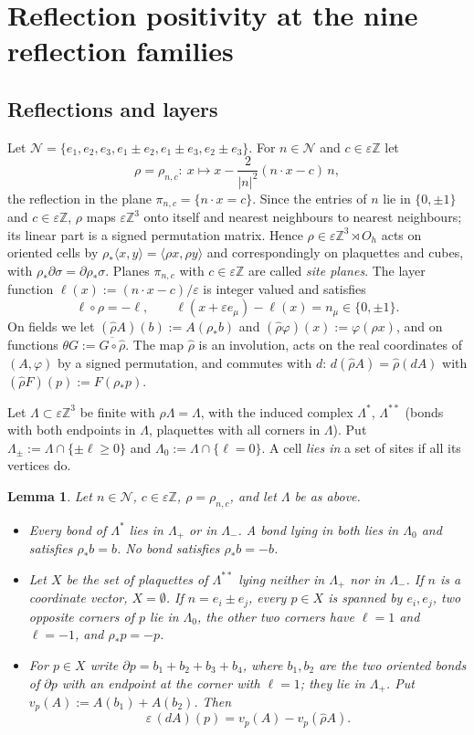 \documentclass[11pt]{amsart}
\theoremstyle{plain}
\newtheorem{lemma}[theorem]{Lemma}
\theoremstyle{definition}
\theoremstyle{remark}
\numberwithin{equation}{section}
\newcommand{\Z}{\mathbb{Z}}
\newcommand{\eps}{\varepsilon}
\newcommand{\cN}{\mathcal{N}}
\newcommand{\Oh}{O_h}
\newcommand{\abs}[1]{\lvert #1\rvert}
\newcommand{\ev}[1]{\langle #1\rangle}
\begin{document}
\section{Reflection positivity at the nine reflection families}\label{sec:RP}

\subsection{Reflections and layers}
Let $\cN=\{e_1,e_2,e_3,e_1\pm e_2,e_1\pm e_3,e_2\pm e_3\}$. For $n\in\cN$ and $c\in\eps\Z$ let
\[
\rho=\rho_{n,c}:\ x\mapsto x-\frac{2}{\abs n^2}(n\cdot x-c)\,n ,
\]
the reflection in the plane $\pi_{n,c}=\{n\cdot x=c\}$. Since the entries of $n$ lie in $\{0,\pm1\}$ and $c\in\eps\Z$, $\rho$ maps $\eps\Z^3$ onto itself and nearest neighbours to nearest neighbours; its linear part is a signed permutation matrix. Hence $\rho\in\eps\Z^3\rtimes\Oh$ acts on oriented cells by $\rho_*\ev{x,y}=\ev{\rho x,\rho y}$ and correspondingly on plaquettes and cubes, with $\rho_*\partial\sigma=\partial\rho_*\sigma$. Planes $\pi_{n,c}$ with $c\in\eps\Z$ are called \emph{site planes}. The layer function $\ell(x):=(n\cdot x-c)/\eps$ is integer valued and satisfies
\[
\ell\circ\rho=-\ell,\qquad \ell(x+\eps e_\mu)-\ell(x)=n_\mu\in\{0,\pm1\}.
\]
On fields we let $(\hat\rho A)(b):=A(\rho_*b)$ and $(\hat\rho\varphi)(x):=\varphi(\rho x)$, and on functions $\theta G:=\overline{G\circ\hat\rho}$. The map $\hat\rho$ is an involution, acts on the real coordinates of $(A,\varphi)$ by a signed permutation, and commutes with $d$: $d(\hat\rho A)=\hat\rho(dA)$ with $(\hat\rho F)(p):=F(\rho_*p)$.

Let $\Lambda\subset\eps\Z^3$ be finite with $\rho\Lambda=\Lambda$, with the induced complex $\Lambda^*$, $\Lambda^{**}$ (bonds with both endpoints in $\Lambda$, plaquettes with all corners in $\Lambda$). Put $\Lambda_\pm:=\Lambda\cap\{\pm\ell\ge0\}$ and $\Lambda_0:=\Lambda\cap\{\ell=0\}$. A cell \emph{lies in} a set of sites if all its vertices do.

\begin{lemma}\label{lem:cells}
Let $n\in\cN$, $c\in\eps\Z$, $\rho=\rho_{n,c}$, and let $\Lambda$ be as above.
\begin{itemize}
\item[(a)] Every bond of $\Lambda^*$ lies in $\Lambda_+$ or in $\Lambda_-$. A bond lying in both lies in $\Lambda_0$ and satisfies $\rho_*b=b$. No bond satisfies $\rho_*b=-b$.
\item[(b)] Let $X$ be the set of plaquettes of $\Lambda^{**}$ lying neither in $\Lambda_+$ nor in $\Lambda_-$. If $n$ is a coordinate vector, $X=\emptyset$. If $n=e_i\pm e_j$, every $p\in X$ is spanned by $e_i,e_j$, two opposite corners of $p$ lie in $\Lambda_0$, the other two corners have $\ell=1$ and $\ell=-1$, and $\rho_*p=-p$.
\item[(c)] For $p\in X$ write $\partial p=b_1+b_2+b_3+b_4$, where $b_1,b_2$ are the two oriented bonds of $\partial p$ with an endpoint at the corner with $\ell=1$; they lie in $\Lambda_+$. Put $v_p(A):=A(b_1)+A(b_2)$. Then
\[
\eps\,(dA)(p)=v_p(A)-v_p(\hat\rho A).
\]
\end{itemize}
\end{lemma}
\end{document}
